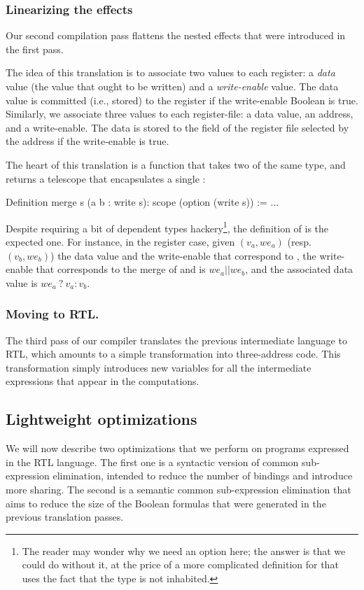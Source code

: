 \documentclass{llncs}
\begin{document}
\subsubsection{Linearizing the effects} Our second compilation pass
flattens the nested effects that were introduced in the first pass.

The idea of this translation is to associate two values to each
register: a \emph{data} value (the value that ought to be written) and
a \emph{write-enable} value. The data value is committed (i.e., stored)
to the register if the write-enable Boolean is true.
%
Similarly, we associate three values to each register-file: a data value, an
address, and a write-enable. The data is stored to the field of the
register file selected by the address if the write-enable is true.  

The heart of this translation is a  function that takes
two  of the same type, and returns a telescope that
encapsulates a single : 
\begin{mcoq}
Definition merge s (a b : write s): scope (option (write s)) := ...   
\end{mcoq}
Despite requiring a bit of dependent types hackery\footnote{The
  reader may wonder why we need an option here; the answer is that we
  could do without it, at the price of a more complicated definition
  for  that uses the fact that the type
%
  \mbox{} is not inhabited.}, the definition of
\mbox{} is the expected one.
%
For instance, in the register case, given $(v_a,we_a)$ (resp. $(v_b,
we_b)$) the data value and the write-enable that correspond to
, the write-enable that corresponds to the merge of 
and  is $we_a || we_b$, and the associated data value is
\mbox{$we_a~?~v_a : v_b$}.

\subsubsection{Moving to RTL.} The third pass of our compiler translates
the previous intermediate language to RTL, which amounts to a simple
transformation into three-address code. This transformation simply
introduces new variables for all the intermediate expressions that
appear in the computations. 

\subsection{Lightweight optimizations}
We will now describe two optimizations that we perform on programs
expressed in the RTL language. 
%
The first one is a syntactic version of common sub-expression
elimination, intended to reduce the number of bindings and introduce
more sharing. 
%
The second is a semantic common sub-expression elimination that aims
to reduce the size of the Boolean formulas that were generated in the
previous translation passes.
\end{document}
